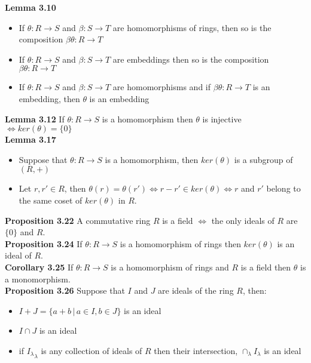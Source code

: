 \documentclass[a4paper]{article}
\begin{document}
\begin{framed}
	\noindent
	\textbf{Lemma 3.10}
	\begin{itemize}
		\item If $\theta: R \rightarrow S$ and $\beta: S \rightarrow T$ are homomorphisms of rings, then so is the composition $\beta\theta: R \rightarrow T$
		\item If $\theta: R \rightarrow S$ and $\beta: S \rightarrow T$ are embeddings then so is the composition $\beta\theta: R \rightarrow T$
		\item If $\theta: R \rightarrow S$ and $\beta: S \rightarrow T$ are homomorphisms and if $\beta\theta: R \rightarrow T$ is an embedding, then $\theta$ is an embedding
	\end{itemize}
	
	\noindent
	\textbf{Lemma 3.12} If $\theta: R \rightarrow S$ is a homomorphism then $\theta$ is injective $\iff ker(\theta) = \{0\}$\\
	
	\noindent
	\textbf{Lemma 3.17} 
	\begin{itemize}
		\item Suppose that $\theta: R \rightarrow S$ is a homomorphism, then $ker(\theta)$ is a subgroup of $(R, +)$
		\item Let $r, r' \in R$, then $\theta(r) = \theta(r') \iff r - r' \in ker(\theta) \iff r$ and $r'$ belong to the same coset of $ker(\theta)$ in $R$.
	\end{itemize}
	
	\noindent
	\textbf{Proposition 3.22} A commutative ring $R$ is a field $\iff$ the only ideals of $R$ are $\{0\}$ and $R$.\\
	
	\noindent
	\textbf{Proposition 3.24} If $\theta: R \rightarrow S$ is a homomorphism of rings then $ker(\theta)$ is an ideal of $R$.\\
	
	\noindent
	\textbf{Corollary 3.25} If $\theta: R \rightarrow S$ is a homomorphism of rings and $R$ is a field then $\theta$ is a monomorphism.\\
	
	\noindent
	\textbf{Proposition 3.26} Suppose that $I$ and $J$ are ideals of the ring $R$, then:
	\begin{itemize}
		\item $I + J = \{ a + b \, \vert \, a \in I, b \in J \}$ is an ideal
		\item $I \cap J$ is an ideal
		\item if ${I_\lambda}_\lambda$ is any collection of ideals of $R$ then their intersection, $\cap_\lambda I_\lambda$ is an ideal
	\end{itemize}
\end{framed}
\end{document}
